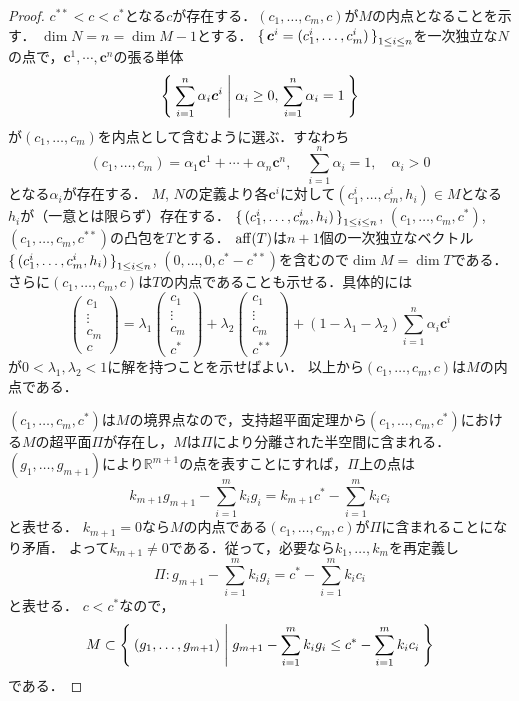 \begin{proof}
  \(c^{**}<c<c^*\)となる\(c\)が存在する．\((c_1, \ldots, c_m, c)\)が\(M\)の内点となることを示す．
  \(\dim N=n=\dim M-1\)とする．
  \(\set{\boldsymbol{c}^i = (c^i_1, \ldots, c^i_m)}_{1\leq i\leq n}\)を一次独立な\(N\)の点で，\(\boldsymbol{c}^1, \cdots, \boldsymbol{c}^n\)の張る単体
  \[ \Set{\sum_{i=1}^n \alpha_i \boldsymbol{c}^i | \alpha_i \geq 0, \, \sum_{i=1}^n \alpha_i = 1 } \]
  が\((c_1, \ldots, c_m)\)を内点として含むように選ぶ．すなわち
  \[
  (c_1, \ldots, c_m) = \alpha_1 \boldsymbol{c}^1 + \cdots + \alpha_n \boldsymbol{c}^n , \quad \sum_{i=1}^n \alpha_i = 1 , \quad \alpha_i > 0
  \]
  となる\(\alpha_i\)が存在する．
  \(M\), \(N\)の定義より各\(\boldsymbol{c}^i\)に対して\((c^i_1, \ldots, c^i_m , h_i) \in M\)となる\(h_i\)が（一意とは限らず）存在する．
  \(\set{(c^i_1, \ldots, c^i_m , h_i)}_{1\leq i\leq n}\), \((c_1, \ldots, c_m, c^*)\), \((c_1, \ldots, c_m, c^{**})\)の凸包を\(T\)とする．
  \(\operatorname{aff}(T)\)は\(n+1\)個の一次独立なベクトル\(\set{(c^i_1, \ldots, c^i_m , h_i)}_{1\leq i\leq n}\), \((0, \ldots, 0, c^*-c^{**})\)を含むので\(\dim M=\dim T\)である．
  さらに\((c_1, \ldots, c_m, c)\)は\(T\)の内点であることも示せる．具体的には
  \[
  \begin{pmatrix}
    c_1 \\ \vdots \\ c_m \\ c
  \end{pmatrix}
  =
  \lambda_1
  \begin{pmatrix}
    c_1 \\ \vdots \\ c_m \\ c^*
  \end{pmatrix}
  + \lambda_2
  \begin{pmatrix}
    c_1 \\ \vdots \\ c_m \\ c^{**}
  \end{pmatrix}
  +
  (1-\lambda_1-\lambda_2)
  \sum_{i=1}^n \alpha_i \boldsymbol{c}^i
  \]
  が\(0<\lambda_1, \lambda_2<1\)に解を持つことを示せばよい．
  以上から\((c_1, \ldots, c_m, c)\)は\(M\)の内点である．

  \((c_1, \ldots, c_m, c^*)\)は\(M\)の境界点なので，支持超平面定理から\((c_1, \ldots, c_m, c^*)\)における\(M\)の超平面\(\Pi\)が存在し，\(M\)は\(\Pi\)により分離された半空間に含まれる．
  \((g_1, \ldots, g_{m+1})\)により\(\mathbb{R}^{m+1}\)の点を表すことにすれば，\(\Pi\)上の点は
  \[ k_{m+1} g_{m+1} - \sum_{i=1}^m k_ig_i = k_{m+1}c^* - \sum_{i=1}^m k_ic_i \]
  と表せる．
  \(k_{m+1}=0\)なら\(M\)の内点である\((c_1, \ldots, c_m, c)\)が\(\Pi\)に含まれることになり矛盾．
  よって\(k_{m+1}\neq0\)である．従って，必要なら\(k_1, \ldots, k_m\)を再定義し
  \[ \Pi \colon g_{m+1} - \sum_{i=1}^m k_ig_i = c^* - \sum_{i=1}^m k_ic_i \]
  と表せる．
  \(c<c^*\)なので，
  \[ M \subset \Set{ (g_1, \ldots, g_{m+1}) | g_{m+1} - \sum_{i=1}^m k_ig_i \leq c^* - \sum_{i=1}^m k_ic_i  } \]
  である．


\end{proof}
